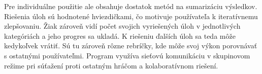 \documentclass[a4paper,12pt]{article}
\begin{document}
Pre individuálne použitie ale obsahuje dostatok metód na sumarizáciu výsledkov.
Riešenia úloh sú hodnotené hviezdičkami, čo motivuje používateľa k iteratívnemu zlepšovaniu.
Žiak zároveň vidí počet svojich vyriešených úloh v jednotlivých kategóriách a jeho progres sa ukladá.
K riešeniu ďalších úloh sa teda môže kedykoľvek vrátiť. Sú tu zároveň rôzne rebríčky, kde môže svoj
výkon porovnávať s ostatnými používateľmi. Program využíva sieťovú komunikáciu v skupinovom režime
pri súťažení proti ostatným hráčom a kolaboratívnom riešení.
\end{document}
